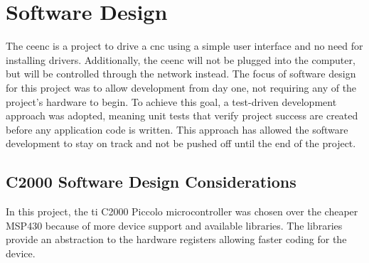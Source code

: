 \newpage
\section{Software Design}
The \gls{ceenc} is a project to drive a \gls{cnc} using a simple user interface and no need for installing drivers.
Additionally, the \gls{ceenc} will not be plugged into the computer, but will be controlled through the network instead.
The focus of software design for this project was to allow development from day one, not requiring any of the project's hardware to begin.
To achieve this goal, a test-driven development approach was adopted, meaning unit tests that verify project success are created before any application code is written.
This approach has allowed the software development to stay on track and not be pushed off until the end of the project.

\subsection{C2000 Software Design Considerations}
In this project, the \gls{ti} C2000 Piccolo microcontroller was chosen over the cheaper MSP430 because of more device support and available libraries.
The libraries provide an abstraction to the hardware registers allowing faster coding for the device. 

